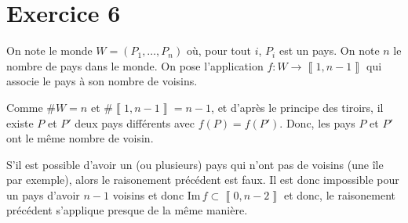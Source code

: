 \part{Exercice 6}

On note le monde $W = (P_1, \ldots, P_n)$ où, pour tout $i$, $P_i$ est un pays. On note $n$ le nombre de pays dans le monde. On pose l'application $f: W \to \left\llbracket 1,n-1 \right\rrbracket$ qui associe le pays à son nombre de voisins. 

Comme $\#W = n$ et $\#\left\llbracket 1,n-1 \right\rrbracket = n - 1$, et d'après le principe des tiroirs, il existe $P$ et $P'$ deux pays différents avec $f(P) = f(P')$. Donc, les pays $P$ et $P'$ ont le même nombre de voisin.

S'il est possible d'avoir un (ou plusieurs) pays qui n'ont pas de voisins (une île par exemple), alors le raisonement précédent est faux. Il est donc impossible pour un pays d'avoir $n - 1$ voisins et donc $\mathrm{Im}\,f \subset \left\llbracket 0,n-2 \right\rrbracket$ et donc, le raisonement précédent s'applique presque de la même manière.

